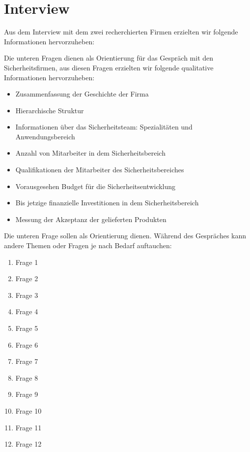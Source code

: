 \section{Interview}\label{appendix:interview}

Aus dem Interview mit dem zwei recherchierten Firmen erzielten wir folgende Informationen hervorzuheben:

Die unteren Fragen dienen als Orientierung für das Gespräch mit den Sicherheitsfirmen, aus diesen Fragen erzielten
wir folgende qualitative Informationen hervorzuheben:

\begin{itemize}
    \item Zusammenfassung der Geschichte der Firma
    \item Hierarchische Struktur
    \item Informationen über das Sicherheitsteam: Spezialitäten und Anwendungsbereich
    \item Anzahl von Mitarbeiter in dem Sicherheitsbereich
    \item Qualifikationen der Mitarbeiter des Sicherheitsbereiches
    \item Vorausgesehen Budget für die Sicherheitsentwicklung
    \item Bis jetzige finanzielle Investitionen in dem Sicherheitsbereich
    \item Messung der Akzeptanz der gelieferten Produkten
\end{itemize}

Die unteren Frage sollen als Orientierung dienen. Während des Gespräches kann andere Themen oder Fragen je nach Bedarf
auftauchen:

\begin{enumerate}
    \item Frage 1
    \item Frage 2
    \item Frage 3
    \item Frage 4
    \item Frage 5    
    \item Frage 6
    \item Frage 7
    \item Frage 8
    \item Frage 9
    \item Frage 10
    \item Frage 11
    \item Frage 12
\end{enumerate}
